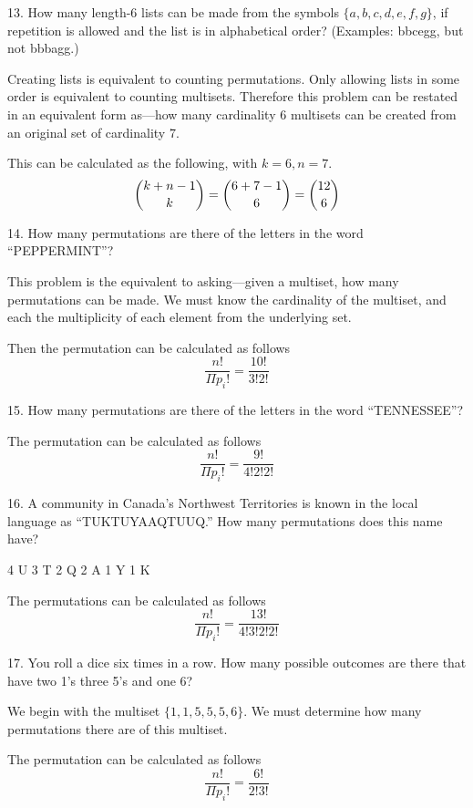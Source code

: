 \documentclass{idrisMemo}
\begin{document}
\begin{prooflist}{13. How many length-6 lists can be made from the symbols $\{a,
    b, c, d, e, f, g\}$, if repetition is allowed and the list is in
    alphabetical order? (Examples: bbcegg, but not bbbagg.)}
\item Creating lists is equivalent to counting permutations. Only allowing lists
    in some order is equivalent to counting multisets. Therefore this problem
    can be restated in an equivalent form as---how many cardinality 6 multisets
    can be created from an original set of cardinality 7.
\item This can be calculated as the following, with $k=6, n=7$.
    $$ \dbinom{k+n-1}{k} = \dbinom{6+7-1}{6}=\dbinom{12}{6}$$
\end{prooflist}

\begin{prooflist}{14. How many permutations are there of the letters in the word “PEPPERMINT”?}
\item This problem is the equivalent to asking---given a multiset, how many
    permutations can be made.  We must know the cardinality of the multiset, and each
    the multiplicity of each element from the underlying set.
\item Then the permutation can be calculated as follows
    $$ \dfrac{n!}{\Pi{p_i}!} = \dfrac{10!}{3!2!}$$
\end{prooflist}

\begin{prooflist}{15. How many permutations are there of the letters in the word “TENNESSEE”?}
\item The permutation can be calculated as follows
    $$ \dfrac{n!}{\Pi{p_i}!} = \dfrac{9!}{4!2!2!}$$
\end{prooflist}

\begin{prooflist}{16. A community in Canada’s Northwest Territories is known in the local language as “TUKTUYAAQTUUQ.” How many permutations does this name have?}
\item
      4 U
      3 T
      2 Q
      2 A
      1 Y
      1 K
\item The permutations can be calculated as follows
    $$ \dfrac{n!}{\Pi{p_i}!} = \dfrac{13!}{4!3!2!2!}$$
\end{prooflist}

\begin{prooflist}{17. You roll a dice six times in a row. How many possible outcomes are there that have two 1’s three 5’s and one 6?}
\item We begin with the multiset $\{1, 1, 5, 5, 5, 6\}$. We must determine how
    many permutations there are of this multiset.
\item The permutation can be calculated as follows
    $$ \dfrac{n!}{\Pi{p_i}!} = \dfrac{6!}{2!3!}$$
\end{prooflist}
\end{document}
